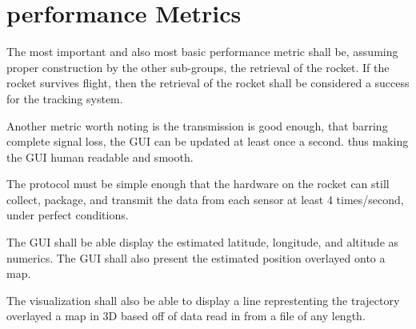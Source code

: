 \documentclass[onecolumn, draftclsnofoot,10pt, compsoc]{IEEEtran}
\begin{document}
\section{performance Metrics}
The most important and also most basic performance metric shall be, assuming proper construction by the other sub-groups, the retrieval of the rocket. If the rocket survives flight, then the retrieval of the rocket shall be considered a success for the tracking system. \par 
Another metric worth noting is the transmission is good enough, that barring complete signal loss, the GUI can be updated at least once a second. thus making the GUI human readable and smooth.\par
 The protocol must be simple enough that the hardware on the rocket can still collect, package, and transmit the data from each sensor at least 4 times/second, under perfect conditions. \par
The GUI shall be able display the estimated latitude, longitude, and altitude as numerics. The GUI shall also present the estimated position overlayed onto a map. \par
The visualization shall also be able to display a line represtenting the trajectory overlayed a map in 3D based off of data read in from a file of any length. \par
\end{document}
